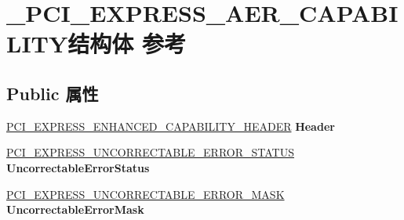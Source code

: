 \hypertarget{struct___p_c_i___e_x_p_r_e_s_s___a_e_r___c_a_p_a_b_i_l_i_t_y}{}\section{\+\_\+\+P\+C\+I\+\_\+\+E\+X\+P\+R\+E\+S\+S\+\_\+\+A\+E\+R\+\_\+\+C\+A\+P\+A\+B\+I\+L\+I\+T\+Y结构体 参考}
\label{struct___p_c_i___e_x_p_r_e_s_s___a_e_r___c_a_p_a_b_i_l_i_t_y}
\subsection*{Public 属性}
\begin{DoxyCompactItemize}
\item 
\mbox{\label{struct___p_c_i___e_x_p_r_e_s_s___a_e_r___c_a_p_a_b_i_l_i_t_y_a3474aac409d35350ba9baff9f26f97b1}} 
\hyperlink{struct___p_c_i___e_x_p_r_e_s_s___e_n_h_a_n_c_e_d___c_a_p_a_b_i_l_i_t_y___h_e_a_d_e_r}{P\+C\+I\+\_\+\+E\+X\+P\+R\+E\+S\+S\+\_\+\+E\+N\+H\+A\+N\+C\+E\+D\+\_\+\+C\+A\+P\+A\+B\+I\+L\+I\+T\+Y\+\_\+\+H\+E\+A\+D\+ER} {\bfseries Header}
\item 
\mbox{\label{struct___p_c_i___e_x_p_r_e_s_s___a_e_r___c_a_p_a_b_i_l_i_t_y_a6924f0c1c1ec59b37b6b5b967aa731cd}} 
\hyperlink{union___p_c_i___e_x_p_r_e_s_s___u_n_c_o_r_r_e_c_t_a_b_l_e___e_r_r_o_r___s_t_a_t_u_s}{P\+C\+I\+\_\+\+E\+X\+P\+R\+E\+S\+S\+\_\+\+U\+N\+C\+O\+R\+R\+E\+C\+T\+A\+B\+L\+E\+\_\+\+E\+R\+R\+O\+R\+\_\+\+S\+T\+A\+T\+US} {\bfseries Uncorrectable\+Error\+Status}
\item 
\mbox{\label{struct___p_c_i___e_x_p_r_e_s_s___a_e_r___c_a_p_a_b_i_l_i_t_y_a6605d7021d7d297697fa95eb559617be}} 
\hyperlink{union___p_c_i___e_x_p_r_e_s_s___u_n_c_o_r_r_e_c_t_a_b_l_e___e_r_r_o_r___m_a_s_k}{P\+C\+I\+\_\+\+E\+X\+P\+R\+E\+S\+S\+\_\+\+U\+N\+C\+O\+R\+R\+E\+C\+T\+A\+B\+L\+E\+\_\+\+E\+R\+R\+O\+R\+\_\+\+M\+A\+SK} {\bfseries Uncorrectable\+Error\+Mask}
\item 
\mbox{\label{struct___p_c_i___e_x_p_r_e_s_s___a_e_r___c_a_p_a_b_i_l_i_t_y_a19a23dde7469c57506064e5a433c23e3}} 

\end{DoxyCompactItemize}
